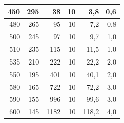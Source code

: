 \begin{enumerate}
\begin{table}[h!]
\begin{tabular}{|r|r|r|r|r|r|}
					450                                               & 295                                                        & 38                         & 10                          & 3,8                                & 0,6                                       \\ \hline
					480                                               & 265                                                        & 95                         & 10                          & 7,2                                & 0,8                                       \\ \hline
					500                                               & 245                                                        & 97                         & 10                          & 9,7                                & 1,0                                       \\ \hline
					510                                               & 235                                                        & 115                        & 10                          & 11,5                               & 1,0                                       \\ \hline
					535                                               & 210                                                        & 222                        & 10                          & 22,2                               & 2,0                                       \\ \hline
					550                                               & 195                                                        & 401                        & 10                          & 40,1                               & 2,0                                       \\ \hline
					580                                               & 165                                                        & 722                        & 10                          & 72,2                               & 3,0                                       \\ \hline
					590                                               & 155                                                        & 996                        & 10                          & 99,6                               & 3,0                                       \\ \hline
					600                                               & 145                                                        & 1182                       & 10                          & 118,2                              & 4,0                                       \\ \hline

\end{tabular}
\end{table}
\end{enumerate}
